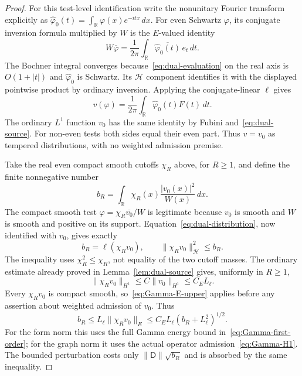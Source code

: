 \documentclass[11pt,a4paper]{article}
\numberwithin{equation}{section}
\theoremstyle{definition}
\theoremstyle{remark}
\newcommand{\R}{\mathbb R}
\newcommand{\Hh}{\mathcal H}
\newcommand{\norm}[1]{\lVert #1\rVert}
\begin{document}
\begin{proof}
For this test-level identification write the nonunitary Fourier transform explicitly as
$\widehat\varphi_0(t)=\int_\R\varphi(x)e^{-itx}\,dx$.
For even Schwartz $\varphi$, its conjugate inversion formula multiplied by $W$ is the $E$-valued identity
\[
 W\overline\varphi
 =\frac1{2\pi}\int_\R\overline{\widehat\varphi_0(t)}\,e_t\,dt.
\]
The Bochner integral converges because~\eqref{eq:dual-evaluation} on the real axis is $O(1+|t|)$ and $\widehat\varphi_0$ is Schwartz. Its $\Hh$ component identifies it with the displayed pointwise product by ordinary inversion. Applying the conjugate-linear $\ell$ gives
\begin{equation}\label{eq:dual-test-Fourier}
 v(\varphi)=\frac1{2\pi}\int_\R\widehat\varphi_0(t)F(t)\,dt.
\end{equation}
The ordinary $L^1$ function $v_0$ has the same identity by Fubini and~\eqref{eq:dual-source}. For non-even tests both sides equal their even part. Thus $v=v_0$ as tempered distributions, with no weighted admission premise.

Take the real even compact smooth cutoffs $\chi_R$ above, for $R\ge1$, and define the finite nonnegative number
\[
 b_R=\int_\R\chi_R(x)\frac{|v_0(x)|^2}{W(x)}\,dx.
\]
The compact smooth test $\varphi=\chi_R\overline{v_0}/W$ is legitimate because $v_0$ is smooth and $W$ is smooth and positive on its support. Equation~\eqref{eq:dual-distribution}, now identified with $v_0$, gives exactly
\begin{equation}\label{eq:dual-cutoff-test}
 b_R=\ell(\chi_Rv_0),\qquad
 \norm{\chi_Rv_0}_{\Hh}^2\le b_R.
\end{equation}
The inequality uses $\chi_R^2\le\chi_R$, not equality of the two cutoff masses. The ordinary estimate already proved in Lemma~\ref{lem:dual-source} gives, uniformly in $R\ge1$,
\[
 \norm{\chi_Rv_0}_{H^1}\le C\norm{v_0}_{H^1}\le C_E L_\ell.
\]
Every $\chi_Rv_0$ is compact smooth, so~\eqref{eq:Gamma-E-upper} applies before any assertion about weighted admission of $v_0$. Thus
\begin{equation}\label{eq:dual-quadratic}
 b_R\le L_\ell\norm{\chi_Rv_0}_E
 \le C_E L_\ell(b_R+L_\ell^2)^{1/2}.
\end{equation}
For the form norm this uses the full Gamma energy bound in~\eqref{eq:Gamma-first-order}; for the graph norm it uses the actual operator admission~\eqref{eq:Gamma-H1}. The bounded perturbation costs only $\norm{\mathsf D}\sqrt{b_R}$ and is absorbed by the same inequality.


\end{proof}
\end{document}
